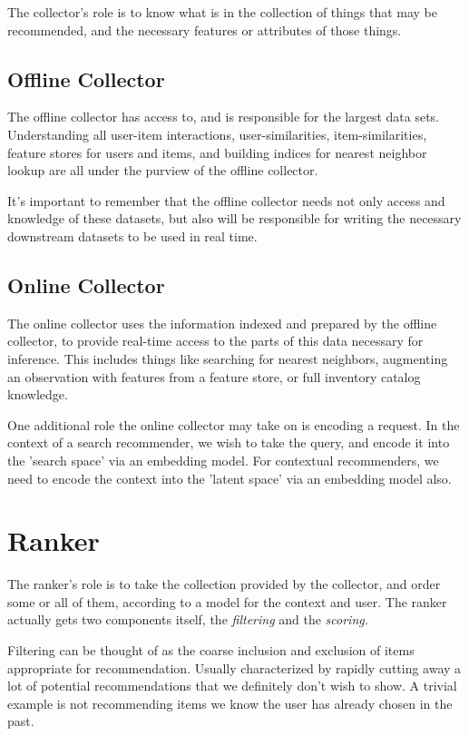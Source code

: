 The collector's role is to know what is in the collection of things that may be recommended, and the necessary features or attributes of those things.

\subsection{Offline Collector}

The offline collector has access to, and is responsible for the largest data sets. Understanding all user-item interactions, user-similarities, item-similarities, feature stores for users and items, and building indices for nearest neighbor lookup are all under the purview of the offline collector.

It's important to remember that the offline collector needs not only access and knowledge of these datasets, but also will be responsible for writing the necessary downstream datasets to be used in real time.

\subsection{Online Collector}

The online collector uses the information indexed and prepared by the offline collector, to provide real-time access to the parts of this data necessary for inference. This includes things like searching for nearest neighbors, augmenting an observation with features from a feature store, or full inventory catalog knowledge. 

One additional role the online collector may take on is encoding a request. In the context of a search recommender, we wish to take the query, and encode it into the 'search space' via an embedding model. For contextual recommenders, we need to encode the context into the 'latent space' via an embedding model also. 

\section{Ranker}

The ranker's role is to take the collection provided by the collector, and order some or all of them, according to a model for the context and user. The ranker actually gets two components itself, the \emph{filtering} and the \emph{scoring.}

Filtering can be thought of as the coarse inclusion and exclusion of items appropriate for recommendation. Usually characterized by rapidly cutting away a lot of potential recommendations that we definitely don't wish to show. A trivial example is not recommending items we know the user has already chosen in the past.

